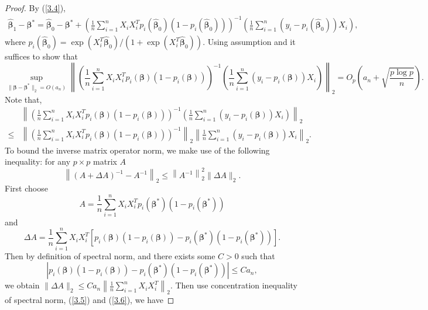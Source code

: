 \begin{proof}
	By (\ref{3.4}), 
	\begin{align*}
	\widehat{\boldsymbol{\beta}}_1-\boldsymbol{\beta}^{*}=\widehat{\boldsymbol{\beta}}_0-\boldsymbol{\beta}^{*}+\left(\frac{1}{n}\sum_{i=1}^{n} X_{i} X_{i}^{T} p_{i}(\widehat{\boldsymbol{\beta}}_0)\left(1-p_{i}(\widehat{\boldsymbol{\beta}}_0)\right)\right)^{-1}\left(\frac{1}{n}\sum_{i=1}^{n}\left(y_{i}-p_{i}(\widehat{\boldsymbol{\beta}}_0)\right) X_{i}\right),
	\end{align*}
	where $p_{i}\left(\widehat{\boldsymbol{\beta}}_0\right)=\exp(X_i^T\widehat{\boldsymbol{\beta}}_0)/\left(1+\exp(X_i^T\widehat{\boldsymbol{\beta}}_0)\right)$. Using assumption and it suffices to show that
	$$
	\sup_{\|\boldsymbol{\beta}-\boldsymbol{\beta}^{*}\|_2=O(a_n)}\left\|\left(\frac{1}{n}\sum_{i=1}^{n} X_{i} X_{i}^{T} p_{i}(\boldsymbol{\beta})\left(1-p_{i}(\boldsymbol{\beta})\right)\right)^{-1}\left(\frac{1}{n}\sum_{i=1}^{n}\left(y_{i}-p_{i}(\boldsymbol{\beta})\right) X_{i}\right)\right\|_2=O_p\left(a_n+\sqrt{\frac{p\log p}{n}}\right).
	$$
	Note that,
	 \begin{align*}
	 &\left\|\left(\frac{1}{n}\sum_{i=1}^{n} X_{i} X_{i}^{T} p_{i}(\boldsymbol{\beta})\left(1-p_{i}(\boldsymbol{\beta})\right)\right)^{-1}\left(\frac{1}{n}\sum_{i=1}^{n}\left(y_{i}-p_{i}(\boldsymbol{\beta})\right) X_{i}\right)\right\|_2 \\
	 \leq &\left\|\left(\frac{1}{n}\sum_{i=1}^{n} X_{i} X_{i}^{T} p_{i}(\boldsymbol{\beta})\left(1-p_{i}(\boldsymbol{\beta})\right)\right)^{-1}\right\|_2 \left\|\frac{1}{n}\sum_{i=1}^{n}\left(y_{i}-p_{i}(\boldsymbol{\beta})\right) X_{i}\right\|_2.
	 \end{align*}
	 To bound the inverse matrix operator norm, we make use of the following inequality: for any $p\times p$ matrix $A$
	 $$
	 \left\|(A+\Delta A)^{-1}-A^{-1}\right\|_{2} \leq\left\|A^{-1}\right\|_{2}^{2}\|\Delta A\|_{2}.
	 $$
	 First choose 
	 $$A= \frac{1}{n}\sum_{i=1}^{n} X_{i} X_{i}^{T} p_{i}(\boldsymbol{\beta}^{*})\left(1-p_{i}(\boldsymbol{\beta}^{*})\right)$$ 
	 and 
	 $$
	 \Delta A=\frac{1}{n}\sum_{i=1}^{n} X_{i} X_{i}^{T} \left[p_{i}(\boldsymbol{\beta})\left(1-p_{i}(\boldsymbol{\beta})\right)-p_{i}(\boldsymbol{\beta}^{*})\left(1-p_{i}(\boldsymbol{\beta}^{*})\right)\right].
	 $$
	 Then by definition of spectral norm, and there exists some $C>0$ such that
	 $$
	 \left|p_{i}(\boldsymbol{\beta})\left(1-p_{i}(\boldsymbol{\beta})\right)-p_{i}(\boldsymbol{\beta}^{*})\left(1-p_{i}(\boldsymbol{\beta}^{*})\right)\right|\leq C a_n,
	 $$
	 we obtain $\| \Delta A\|_2\leq Ca_n\left\|\frac{1}{n}\sum_{i=1}^{n} X_{i} X_{i}^{T}\right\|_2$. Then use concentration inequality of spectral norm, (\ref{3.5}) and (\ref{3.6}), we have

\end{proof}
